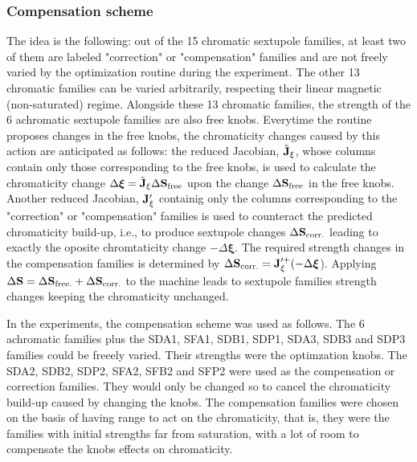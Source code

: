 \subsubsection{Compensation scheme}
The idea is the following: out of the 15 chromatic sextupole families, at least two of them are labeled "correction" or "compensation" families and are not freely varied by the optimization routine during the experiment. The other 13 chromatic families can be varied arbitrarily, respecting their linear magnetic (non-saturated) regime. Alongside these 13 chromatic families, the strength of the 6 achromatic sextupole families are also free knobs.  Everytime the routine proposes changes in the free knobs, the chromaticity changes caused by this action are anticipated as follows: the reduced Jacobian, $\tilde{\vb{J}}_\xi$, whose columns contain only those corresponding to the free knobs, is used to calculate the chromaticity change $\Delta \boldsymbol{\xi}=\tilde{\vb{J}}_\xi\Delta\vb{S}_{\text{free}}$ upon the change $\Delta\vb{S}_{\text{free}}$ in the free knobs. Another reduced Jacobian, $\vb{J}_{\xi}^{\prime}$ containig only the columns corresponding to the "correction" or "compensation" families is used to counteract the predicted chromaticity build-up, i.e., to produce sextupole changes $\Delta\vb{S}_{\text{corr.}}$ leading to exactly the oposite chromtaticity change $-\Delta \boldsymbol{\xi}$. The required strength changes in the compensation families is determined by $\Delta \vb{S}_{\text{corr.}} = \vb{J}_{\xi}^{\prime +}(-\Delta \boldsymbol{\xi}$). Applying $\Delta \vb{S} = \Delta \vb{S}_{\text{free.}} + \Delta \vb{S}_{\text{corr.}}$ to the machine leads to sextupole families strength changes keeping the chromaticity unchanged.

In the experiments, the compensation scheme was used as follows. The 6 achromatic families plus the SDA1, SFA1, SDB1, SDP1, SDA3, SDB3 and SDP3 families could be freeely varied. Their strengths were the optimzation knobs. The SDA2, SDB2, SDP2, SFA2, SFB2 and SFP2 were used as the compensation or correction families. They would only be changed so to cancel the chromaticity build-up caused by changing the knobs. The compensation families were chosen on the basis of having range to act on the chromaticity, that is, they were the families with initial strengths far from saturation, with a lot of room to compensate the knobs effects on chromaticity.


